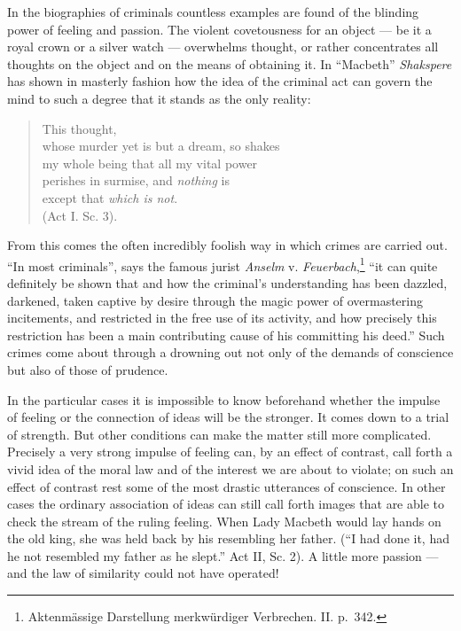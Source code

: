 \documentclass[12pt,a4paper]{book}
\newcommand{\opage}[1]{\marginnote{\footnotesize\textit{[#1]}}}
\begin{document}
In the biographies of criminals countless examples are found of the
blinding power of feeling and passion. The violent covetousness for an
object --- be it a royal crown or a silver watch --- overwhelms thought,
or rather concentrates all thoughts on the object and on the means of
obtaining it. In ``Macbeth'' \emph{Shakspere} has shown in masterly
fashion how the idea of the criminal act can govern the mind to such a
degree that it stands as the only reality:

\begin{verse}
This thought,\\
whose murder yet is but a dream, so shakes\\
my whole being that all my vital power\\
perishes in surmise, and \emph{nothing} is\\
except that \emph{which is not}.\\
\hspace*{\fill}(Act I. Sc. 3).
\end{verse}
\noindent From this comes the often incredibly foolish way in which
crimes are carried out. ``In most criminals'', says the famous jurist
\emph{Anselm} v.
\emph{Feuerbach},\footnote{Aktenmässige Darstellung merkwürdiger
Verbrechen. II. p.~342.} ``it can quite definitely be shown that and how
the criminal's understanding has been dazzled, darkened, taken captive
by desire through the magic power of overmastering incitements, and
restricted in the free use of its activity, and how precisely this
\opage{355}restriction has been a main contributing cause of his
committing his deed.'' Such crimes come about through a drowning out
not only of the demands of conscience but also of those of prudence.

In the particular cases it is impossible to know beforehand whether the
impulse of feeling or the connection of ideas will be the stronger. It
comes down to a trial of strength. But other conditions can make the
matter still more complicated. Precisely a very strong impulse of
feeling can, by an effect of contrast, call forth a vivid idea of the
moral law and of the interest we are about to violate; on such an
effect of contrast rest some of the most drastic utterances of
conscience. In other cases the ordinary association of ideas can still
call forth images that are able to check the stream of the ruling
feeling. When Lady Macbeth would lay hands on the old king, she was held
back by his resembling her father. (``I had done it, had he not
resembled my father as he slept.'' Act II, Sc. 2). A little more
passion --- and the law of similarity could not have operated!
\end{document}
